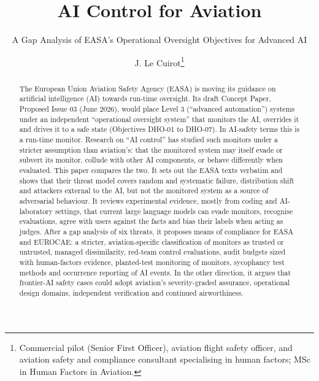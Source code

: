 \documentclass{aer}
\begin{document}

\title{AI Control for Aviation}
\subtitle{A Gap Analysis of EASA's Operational Oversight Objectives for Advanced AI}

\author{J. Le Cuirot\thanks{Commercial pilot (Senior First Officer), aviation flight safety officer, and aviation safety and compliance consultant specialising in human factors; MSc in Human Factors in Aviation.}}

\maketitle
\setcounter{footnote}{0}
\renewcommand{\thefootnote}{\roman{footnote}}%

\begin{abstract}
The European Union Aviation Safety Agency (EASA) is moving its guidance on artificial intelligence (AI) towards run-time oversight. Its draft Concept Paper, Proposed Issue 03 (June 2026), would place Level 3 (``advanced automation'') systems under an independent ``operational oversight system'' that monitors the AI, overrides it and drives it to a safe state (Objectives DHO-01 to DHO-07). In AI-safety terms this is a run-time monitor. Research on ``AI control'' has studied such monitors under a stricter assumption than aviation's: that the monitored system may itself evade or subvert its monitor, collude with other AI components, or behave differently when evaluated. This paper compares the two. It sets out the EASA texts verbatim and shows that their threat model covers random and systematic failure, distribution shift and attackers external to the AI, but not the monitored system as a source of adversarial behaviour. It reviews experimental evidence, mostly from coding and AI-laboratory settings, that current large language models can evade monitors, recognise evaluations, agree with users against the facts and bias their labels when acting as judges. After a gap analysis of six threats, it proposes means of compliance for EASA and EUROCAE: a stricter, aviation-specific classification of monitors as trusted or untrusted, managed dissimilarity, red-team control evaluations, audit budgets sized with human-factors evidence, planted-test monitoring of monitors, sycophancy test methods and occurrence reporting of AI events. In the other direction, it argues that frontier-AI safety cases could adopt aviation's severity-graded assurance, operational design domains, independent verification and continued airworthiness.
\end{abstract}
\end{document}
